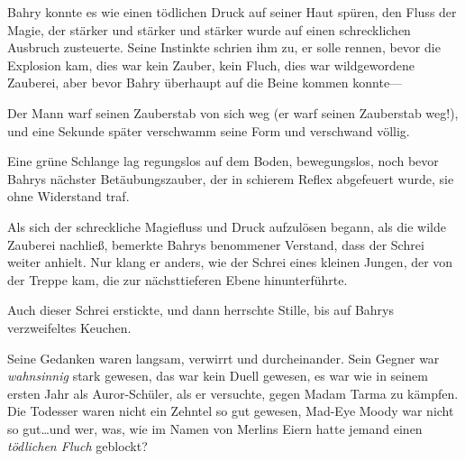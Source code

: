 Bahry konnte es wie einen tödlichen Druck auf seiner Haut spüren, den Fluss der Magie, der stärker und stärker und stärker wurde auf einen schrecklichen Ausbruch zusteuerte. Seine Instinkte schrien ihm zu, er solle rennen, bevor die Explosion kam, dies war kein Zauber, kein Fluch, dies war wildgewordene Zauberei, aber bevor Bahry überhaupt auf die Beine kommen konnte—

Der Mann warf seinen Zauberstab von sich weg (er warf seinen Zauberstab weg!), und eine Sekunde später verschwamm seine Form und verschwand völlig.

Eine grüne Schlange lag regungslos auf dem Boden, bewegungslos, noch bevor Bahrys nächster Betäubungszauber, der in schierem Reflex abgefeuert wurde, sie ohne Widerstand traf.

Als sich der schreckliche Magiefluss und Druck aufzulösen begann, als die wilde Zauberei nachließ, bemerkte Bahrys benommener Verstand, dass der Schrei weiter anhielt. Nur klang er anders, wie der Schrei eines kleinen Jungen, der von der Treppe kam, die zur nächsttieferen Ebene hinunterführte.

Auch dieser Schrei erstickte, und dann herrschte Stille, bis auf Bahrys verzweifeltes Keuchen.

Seine Gedanken waren langsam, verwirrt und durcheinander. Sein Gegner war \emph{wahnsinnig} stark gewesen, das war kein Duell gewesen, es war wie in seinem ersten Jahr als Auror-Schüler, als er versuchte, gegen Madam Tarma zu kämpfen. Die Todesser waren nicht ein Zehntel so gut gewesen, Mad-Eye Moody war nicht so gut…und wer, was, wie im Namen von Merlins Eiern hatte jemand einen \emph{tödlichen Fluch} geblockt?

